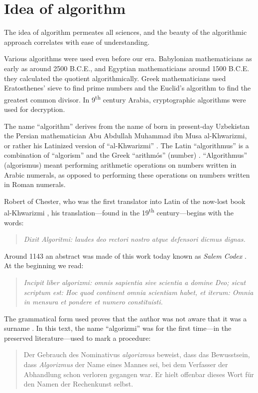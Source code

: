 \documentclass[pdftex,12pt]{article}
\begin{document}
\section{Idea of algorithm} 

The idea of algorithm permeates all sciences, and the beauty of the algorithmic approach correlates with ease of understanding.

Various algorithms were used even before our era. Babylonian mathematicians as early as around 2500 B.C.E., and Egyptian mathematicians around 1500 B.C.E. they calculated the quotient algorithmically. Greek mathematicians used Eratosthenes' sieve to find prime numbers and the Euclid's algorithm to find the greatest common divisor. In 9\textsuperscript{th} century Arabia, cryptographic algorithms were used for decryption.


The name ``algorithm'' derives from the name of born in present-day Uzbekistan the Persian mathematician  Abu Abdullah Muhammad ibn Musa al-Khwarizmi,  or rather his Latinized version of ``al-Khwarizmi'' \parencite[p.1]{Knuth1997}. The Latin ``algorithmus'' is a combination of ``algorism'' and the Greek ``arithm{\'o}s'' (number) \parencite[p.14]{Marciszewski1981}. ``Algorithmus'' (algorismus) meant performing arithmetic operations on numbers written in Arabic numerals, as opposed to performing these operations on numbers written in Roman numerals.


Robert of Chester, who was the first translator into Latin of the now-lost book al-Khwarizmi \parencite[p.411]{Menninger1969}, his translation---found in the 19\textsuperscript{th} century---begins with the words: \begin{quote} \small \emph {Dixit Algoritmi: laudes deo rectori nostro atque defensori dicmus dignas.} \end{quote} Around 1143 \parencite[p.411]{Menninger1958} an abstract was made of this work today known as \emph{Salem Codex}  \parencite{Cantor1865}. At the beginning we read: \begin{quote} \small \emph {Incipit liber algorizmi: omnis sapientia sive scientia a domine Deo; sicut scriptum est: Hoc quod continent omnia scientiam habet, et iterum: Omnia in mensura et pondere et numero constituisti.} \end{quote} The grammatical form used proves that the author was not aware that it was a surname \parencite[p.14, footnote 1]{Cantor1865}. In this text, the name ``algorizmi'' was for the first time---in the preserved literature---used to mark a procedure: \begin{quote} \small Der Gebrauch des Nominativus \emph{algorizmus} beweist, dass das Bewusstsein, dass \emph{Algorizmus} der Name eines Mannes sei, bei dem Verfasser der Abhandlung schon verloren gegangen war. Er hielt offenbar dieses Wort f{\"u}r den Namen der Rechenkunst selbst. \smallskip \end{quote}
\end{document}
